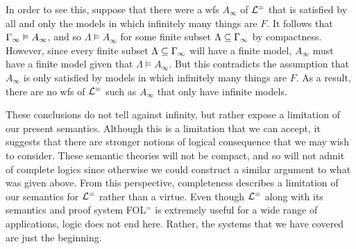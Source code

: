 In order to see this, suppose that there were a wfs $A_\infty$ of $\mathcal{L}^{=}$ that is satisfied by all and only the models in which infinitely many things are $F$.
It follows that $\Gamma_\infty\vDash A_\infty$, and so $\Lambda\vDash A_\infty$ for some finite subset $\Lambda\subseteq\Gamma_\infty$ by compactness.
However, since every finite subset $\Lambda\subseteq\Gamma_\infty$ will have a finite model, $A_\infty$ must have a finite model given that $\Lambda\vDash A_\infty$. 
But this contradicts the assumption that $A_\infty$ is only satisfied by models in which infinitely many things are $F$.
As a result, there are no wfs of $\mathcal{L}^{=}$ such as $A_\infty$ that only have infinite models. %

These conclusions do not tell against infinity, but rather expose a limitation of our present semantics.
Although this is a limitation that we can accept, it suggests that there are stronger notions of logical consequence that we may wish to consider.
These semantic theories will not be compact, and so will not admit of complete logics since otherwise we could construct a similar argument to what was given above.
From this perspective, completeness describes a limitation of our semantics for $\mathcal{L}^{=}$ rather than a virtue.
Even though $\mathcal{L}^{=}$ along with its semantics and proof system FOL$^=$ is extremely useful for a wide range of applications, logic does not end here. 
Rather, the systems that we have covered are just the beginning.



%


